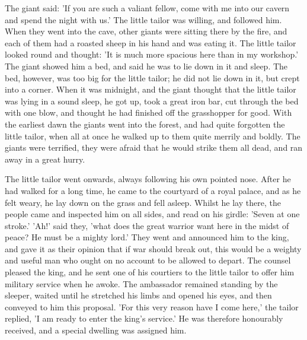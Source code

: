 \documentclass[12pt]{book}
\begin{document}
The giant said: 'If you are such a valiant fellow, come with me into
our cavern and spend the night with us.' The little tailor was
willing, and followed him. When they went into the cave, other giants
were sitting there by the fire, and each of them had a roasted sheep
in his hand and was eating it. The little tailor looked round and
thought: 'It is much more spacious here than in my workshop.' The
giant showed him a bed, and said he was to lie down in it and sleep.
The bed, however, was too big for the little tailor; he did not lie
down in it, but crept into a corner. When it was midnight, and the
giant thought that the little tailor was lying in a sound sleep, he
got up, took a great iron bar, cut through the bed with one blow, and
thought he had finished off the grasshopper for good. With the
earliest dawn the giants went into the forest, and had quite forgotten
the little tailor, when all at once he walked up to them quite merrily
and boldly. The giants were terrified, they were afraid that he would
strike them all dead, and ran away in a great hurry.

The little tailor went onwards, always following his own pointed nose.
After he had walked for a long time, he came to the courtyard of a
royal palace, and as he felt weary, he lay down on the grass and fell
asleep. Whilst he lay there, the people came and inspected him on all
sides, and read on his girdle: 'Seven at one stroke.' 'Ah!' said they,
'what does the great warrior want here in the midst of peace? He must
be a mighty lord.' They went and announced him to the king, and gave
it as their opinion that if war should break out, this would be a
weighty and useful man who ought on no account to be allowed to
depart. The counsel pleased the king, and he sent one of his courtiers
to the little tailor to offer him military service when he awoke. The
ambassador remained standing by the sleeper, waited until he stretched
his limbs and opened his eyes, and then conveyed to him this proposal.
'For this very reason have I come here,' the tailor replied, 'I am
ready to enter the king's service.' He was therefore honourably
received, and a special dwelling was assigned him.
\end{document}

